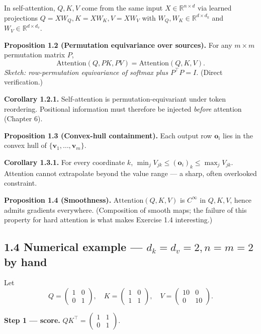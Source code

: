 \documentclass[
]{article}
\begin{document}
In self-attention, \(Q, K, V\) come from the same input
\(X \in \mathbb{R}^{n \times d}\) via learned projections
\(Q = X W_Q, K = X W_K, V = X W_V\) with
\(W_Q, W_K \in \mathbb{R}^{d \times d_k}\) and
\(W_V \in \mathbb{R}^{d \times d_v}\).

\textbf{Proposition 1.2 (Permutation equivariance over sources).} For
any \(m \times m\) permutation matrix \(P\),
\[\text{Attention}(Q, PK, PV) = \text{Attention}(Q, K, V).\]
\emph{Sketch: row-permutation equivariance of softmax plus
\(P^\top P = I\).} (Direct verification.)

\textbf{Corollary 1.2.1.} Self-attention is permutation-equivariant
under token reordering. Positional information must therefore be
injected \emph{before} attention (Chapter 6).

\textbf{Proposition 1.3 (Convex-hull containment).} Each output row
\(\mathbf{o}_i\) lies in the convex hull of
\(\{\mathbf{v}_1, \dots, \mathbf{v}_m\}\).

\textbf{Corollary 1.3.1.} For every coordinate \(k\),
\(\min_j V_{jk} \le (\mathbf{o}_i)_k \le \max_j V_{jk}\). Attention
cannot extrapolate beyond the value range --- a sharp, often overlooked
constraint.

\textbf{Proposition 1.4 (Smoothness).} \(\text{Attention}(Q, K, V)\) is
\(C^\infty\) in \(Q, K, V\), hence admits gradients everywhere.
(Composition of smooth maps; the failure of this property for hard
attention is what makes Exercise 1.4 interesting.)

\hypertarget{numerical-example-d_k-d_v-2-n-m-2-by-hand}{%
\subsection{\texorpdfstring{1.4 Numerical example ---
\(d_k = d_v = 2, n = m = 2\) by
hand}{1.4 Numerical example --- d\_k = d\_v = 2, n = m = 2 by hand}}\label{numerical-example-d_k-d_v-2-n-m-2-by-hand}}

Let
\[Q = \begin{pmatrix} 1 & 0 \\ 0 & 1 \end{pmatrix}, \quad K = \begin{pmatrix} 1 & 0 \\ 1 & 1 \end{pmatrix}, \quad V = \begin{pmatrix} 10 & 0 \\ 0 & 10 \end{pmatrix}.\]

\textbf{Step 1 --- score.}
\(QK^\top = \begin{pmatrix} 1 & 1 \\ 0 & 1 \end{pmatrix}\).
\end{document}
